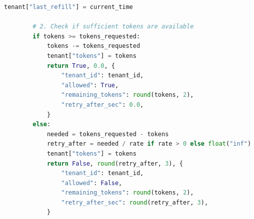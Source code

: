 \begin{lstlisting}[language=Python]
        tenant["last_refill"] = current_time

        # 2. Check if sufficient tokens are available
        if tokens >= tokens_requested:
            tokens -= tokens_requested
            tenant["tokens"] = tokens
            return True, 0.0, {
                "tenant_id": tenant_id,
                "allowed": True,
                "remaining_tokens": round(tokens, 2),
                "retry_after_sec": 0.0,
            }
        else:
            needed = tokens_requested - tokens
            retry_after = needed / rate if rate > 0 else float("inf")
            tenant["tokens"] = tokens
            return False, round(retry_after, 3), {
                "tenant_id": tenant_id,
                "allowed": False,
                "remaining_tokens": round(tokens, 2),
                "retry_after_sec": round(retry_after, 3),
            }
\end{lstlisting}

